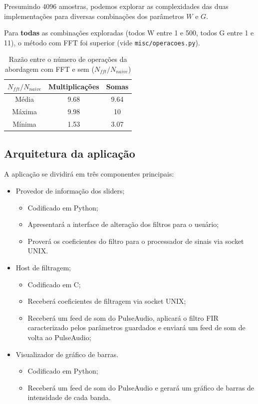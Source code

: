 Presumindo 4096 amostras, podemos explorar as complexidades das duas implementações para diversas combinações dos parâmetros $W$ e $G$.

Para \textbf{todas} as combinações exploradas (todos W entre 1 e 500, todos G entre 1 e 11), o método com FFT foi superior (vide \texttt{misc/operacoes.py}).

\begin{table}[h!]
    \begin{center}
        \begin{tabular}{ |c|c|c| }
        \hline
         $N_{fft}/N_{naive}$ & \textbf{Multiplicações} & \textbf{Somas} \\ 
        \hline
        Média & 9.68 & 9.64 \\  
        Máxima & 9.98 & 10 \\
        Mínima & 1.53 & 3.07 \\
        \hline
        \end{tabular}
        \caption{Razão entre o número de operações da abordagem com FFT e sem ($N_{fft}/N_{naive}$)}
    \end{center}
\end{table}

\subsection{Arquitetura da aplicação}

A aplicação se dividirá em três componentes principais:

\begin{itemize}
    \item Provedor de informação dos sliders;
    \begin{itemize}
        \item Codificado em Python;
        \item Apresentará a interface de alteração dos filtros para o usuário;
        \item Proverá os coeficientes do filtro para o processador de sinais via socket UNIX.
    \end{itemize}
    \item Host de filtragem;
    \begin{itemize}
        \item Codificado em C;
        \item Receberá coeficientes de filtragem via socket UNIX;
        \item Receberá um feed de som do PulseAudio, aplicará o filtro FIR caracterizado pelos parâmetros guardados e enviará um feed de som de volta ao PulseAudio;
    \end{itemize}
    \item Visualizador de gráfico de barras.
    \begin{itemize}
        \item Codificado em Python;
        \item Receberá um feed de som do PulseAudio e gerará um gráfico de barras de intensidade de cada banda.
    \end{itemize}
\end{itemize}

